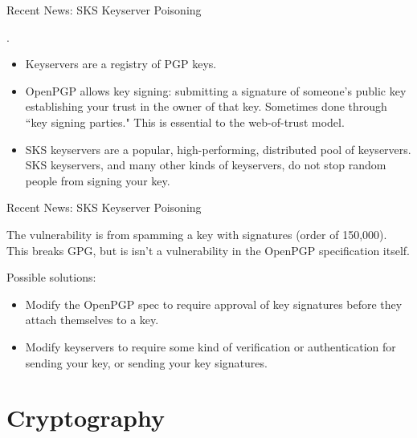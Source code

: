 \documentclass{beamer}
\newcommand{\bhref}[2]{\href{#1}{\color{blue}{\underline{#2}}}}
\begin{document}
\begin{frame}{Recent News: SKS Keyserver Poisoning}
	\setlength{\parskip}{1em}

	\bhref{https://gist.github.com/rjhansen/67ab921ffb4084c865b3618d6955275f}{Full
	write-up}.

	\begin{itemize}
		\item Keyservers are a registry of PGP keys.

		\item OpenPGP allows key signing: submitting a signature of
		someone's public key establishing your trust in the owner of
		that key. Sometimes done through ``key signing parties." This is
		essential to the web-of-trust model.

		\item SKS keyservers are a popular, high-performing, distributed
		pool of keyservers. SKS keyservers, and many other kinds of
		keyservers, do not stop random people from signing your key.
	\end{itemize}
\end{frame}

\begin{frame}{Recent News: SKS Keyserver Poisoning}
	\setlength{\parskip}{1em}

	The vulnerability is from spamming a key with signatures (order of
	150,000). This breaks GPG, but is isn't a vulnerability in the OpenPGP
	specification itself.

	Possible solutions:

	\begin{itemize}
		\item Modify the OpenPGP spec to require approval of key
		signatures before they attach themselves to a key.

		\item Modify keyservers to require some kind of verification or
		authentication for sending your key, or sending your key
		signatures.
	\end{itemize}
\end{frame}

\section{Cryptography}
\end{document}
